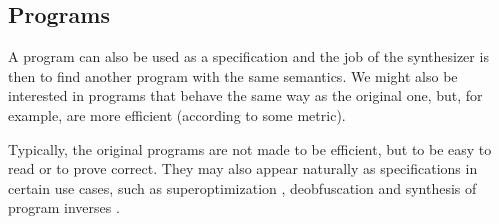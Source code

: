 \subsection{Programs}
\label{sec:programs}

A program can also be used as a specification and the job of the synthesizer is
then to find another program with the same semantics. We might also be
interested in programs that behave the same way as the original one, but, for
example, are more efficient (according to some metric).

Typically, the original programs are not made to be efficient, but to be easy to
read or to prove correct. They may also appear naturally as specifications in
certain use cases, such as
superoptimization \cite{Phothilimthana:2016:SUS},
deobfuscation \cite{Jha:oracle:2010} and
synthesis of program inverses \cite{Srivastava:2011:PIS}.
